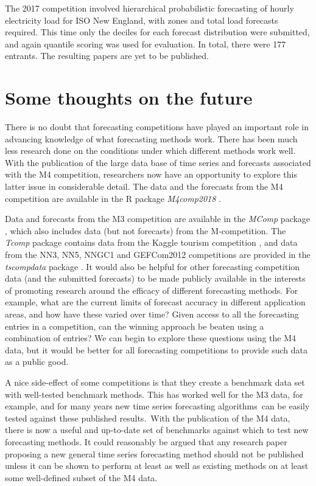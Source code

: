 \documentclass[11pt,a4paper,]{article}
\begin{document}
The 2017 competition involved hierarchical probabilistic forecasting of hourly electricity load for ISO New England, with zones and total load forecasts required. This time only the deciles for each forecast distribution were submitted, and again quantile scoring was used for evaluation. In total, there were 177 entrants. The resulting papers are yet to be published.

\hypertarget{sec:future}{%
\section{Some thoughts on the future}\label{sec:future}}

There is no doubt that forecasting competitions have played an important role in advancing knowledge of what forecasting methods work. There has been much less research done on the conditions under which different methods work well. With the publication of the large data base of time series and forecasts associated with the M4 competition, researchers now have an opportunity to explore this latter issue in considerable detail. The data and the forecasts from the M4 competition are available in the R package \emph{M4comp2018} \autocite{RM4comp2018}.

Data and forecasts from the M3 competition are available in the \emph{MComp} package \autocite{RMcomp}, which also includes data (but not forecasts) from the M-competition. The \emph{Tcomp} package contains data from the Kaggle tourism competition \autocite{RTcomp}, and data from the NN3, NN5, NNGC1 and GEFCom2012 competitions are provided in the \emph{tscompdata} package \autocite{Rtscompdata}. It would also be helpful for other forecasting competition data (and the submitted forecasts) to be made publicly available in the interests of promoting research around the efficacy of different forecasting methods. For example, what are the current limits of forecast accuracy in different application areas, and how have these varied over time? Given access to all the forecasting entries in a competition, can the winning approach be beaten using a combination of entries? We can begin to explore these questions using the M4 data, but it would be better for all forecasting competitions to provide such data as a public good.

A nice side-effect of some competitions is that they create a benchmark data set with well-tested benchmark methods. This has worked well for the M3 data, for example, and for many years new time series forecasting algorithms~can be easily tested against these published results.~With the publication of the M4 data, there is now a useful and up-to-date set of benchmarks against which to test new forecasting methods. It could reasonably be argued that any research paper proposing a new general time series forecasting method should not be published unless it can be shown to perform at least as well as existing methods on at least some well-defined subset of the M4 data.
\end{document}
